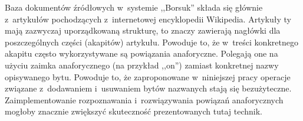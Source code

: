 \documentclass[a4paper, twoside, 12pt]{report}
\begin{document}
    Baza dokumentów źródłowych w~systemie ,,Borsuk'' składa się głównie z~artykułów pochodzących z~internetowej encyklopedii
    Wikipedia. Artykuły ty mają zazwyczaj uporządkowaną strukturę, to znaczy zawierają nagłówki dla poszczególnych
    części (akapitów) artykułu. Powoduje to, że w~treści konkretnego akapitu często wykorzystywane są powiązania anaforyczne.
    Polegają one na użyciu zaimka anaforycznego (na przykład ,,on'') zamiast konkretnej nazwy opisywanego bytu. Powoduje
    to, że zaproponowane w~niniejszej pracy operacje związane z~dodawaniem i~usuwaniem bytów nazwanych stają się bezużyteczne.
    Zaimplementowanie rozpoznawania i~rozwiązywania powiązań anaforycznych mogłoby znacznie zwiększyć skuteczność
    prezentowanych tutaj technik.


\clearpage
{}


\end{document}
